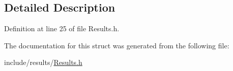 \subsection{Detailed Description}


Definition at line 25 of file Results.\+h.



The documentation for this struct was generated from the following file\+:\begin{DoxyCompactItemize}
\item 
include/results/\hyperlink{_results_8h}{Results.\+h}\end{DoxyCompactItemize}
